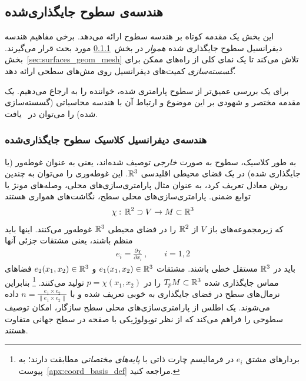 

\subsection{هندسه‌ی سطوح جایگذاری‌شده}
\label{sec:surfaces_geom_main}

این بخش یک مقدمه کوتاه بر هندسه سطوح ارائه می‌دهد.
برخی مفاهیم هندسه دیفرانسیل سطوح جایگذاری شده \emph{هموار} در بخش~\ref{sec:surfaces_geom_classical_smooth} مورد بحث قرار می‌گیرند.
بخش~\ref{sec:surfaces_geom_mesh} تلاش می‌کند تا یک نمای کلی از راه‌های ممکن برای \emph{گسسته‌سازی} کمیت‌های دیفرانسیل روی مش‌های سطحی ارائه دهد.

برای یک بررسی عمیق‌تر از سطوح پارامتری شده، خواننده را به \cite{gallier2011geomMethods} ارجاع می‌دهیم.
یک مقدمه مختصر و شهودی بر این موضوع و ارتباط آن با هندسه محاسباتی (گسسته‌سازی شده) را می‌توان در~\cite{craneDiscreteDifferentialGeometry2014} یافت.






\subsubsection{هندسه‌ی دیفرانسیل کلاسیک سطوح جایگذاری‌شده}
\label{sec:surfaces_geom_classical_smooth}

به طور کلاسیک، سطوح به صورت \emph{خارجی} توصیف شده‌اند، یعنی به عنوان غوطه‌ور (یا جایگذاری شده) در یک فضای محیطی اقلیدسی $\mathbb{R}^3$.
این غوطه‌وری را می‌توان به چندین روش معادل تعریف کرد، به عنوان مثال پارامتری‌سازی‌های محلی، وصله‌های مونژ یا توابع ضمنی.
پارامتری‌سازی‌های محلی سطح، نگاشت‌های همواری هستند
\begin{align}
    \chi:\, \mathbb{R}^2 \supset V \to M \subset \mathbb{R}^3
\end{align}
که زیرمجموعه‌های باز $V$ از $\mathbb{R}^2$ را در فضای محیطی $\mathbb{R}^3$ غوطه‌ور می‌کنند.
اینها باید منظم باشند، یعنی مشتقات جزئی آنها
\begin{align}
    e_i = \frac{\partial\chi}{\partial x_i}\ ,\qquad i=1,2
\end{align}
باید در $\mathbb{R}^3$ مستقل خطی باشند.
مشتقات $e_1(x_1,x_2) \in\mathbb{R}^3$ و $e_2(x_1,x_2) \in\mathbb{R}^3$
فضاهای مماس جایگذاری شده $T_{\mkern-1.5mu p}\mkern-.5muM \subset \mathbb{R}^3$ را در $p=\chi(x_1,x_2)$ تولید می‌کنند.%
\footnote{
    بردارهای مشتق $e_i$ در فرمالیسم چارت ذاتی با \emph{پایه‌های مختصاتی} مطابقت دارند؛ به پیوست~\ref{apx:coord_basis_def} مراجعه کنید.
}
بنابراین نرمال‌های سطح در فضای جایگذاری به خوبی تعریف شده و با $n = \frac{e_1 \times e_2}{\lVert e_1\times e_2\rVert}$ داده می‌شوند.
یک اطلس از پارامتری‌سازی‌های محلی سطح سازگار، امکان توصیف سطوحی را فراهم می‌کند که از نظر توپولوژیکی با صفحه در سطح جهانی متفاوت هستند.


